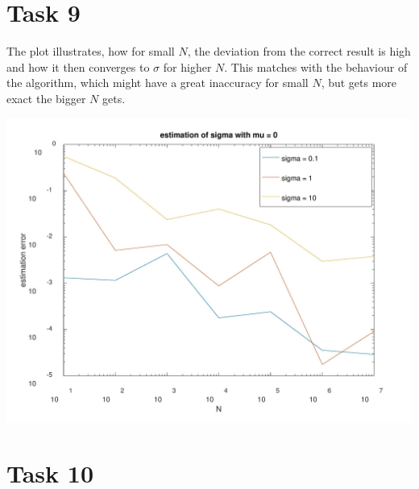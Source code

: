 \documentclass[10pt,a4paper]{article}
\begin{document}
\newpage

\section*{Task 9}

The plot illustrates, how for small $N$, the deviation from the correct result is high and how it then converges to $\sigma$ for higher $N$. This matches with the behaviour of the algorithm, which might have a great inaccuracy for small $N$, but gets more exact the bigger $N$ gets.

\begin{center}
\includegraphics[scale=0.3]{sigma_err.jpeg}
\end{center}

\section*{Task 10}
\end{document}
